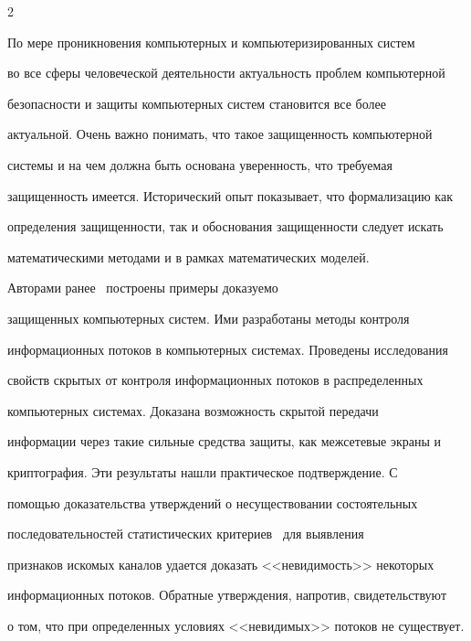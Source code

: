       \begin{multicols}{2}





      \label{st\stat}





    По мере проникновения компьютерных и компьютеризированных систем 


во все сферы человеческой деятельности актуальность проблем компьютерной 


безопасности и защиты компьютерных систем становится все более 


актуальной. Очень важно понимать, что такое защищенность компьютерной 


системы и на чем должна быть основана уверенность, что требуемая 


защищенность имеется. Исторический опыт показывает, что формализацию как 


определения защищенности, так и обоснования защищенности следует искать 


математическими методами и в рамках математических моделей.


    


    Авторами ранее~\cite{5gr, 6gr} построены примеры доказуемо 


защищенных компьютерных систем. Ими разработаны методы контроля 


информационных потоков в компьютерных системах. Проведены исследования 


свойств скрытых от контроля информационных потоков в распределенных 


компьютерных системах. Доказана возможность скрытой передачи 


информации через такие сильные средства защиты, как межсетевые экраны и 


криптография. Эти результаты нашли практическое подтверждение. С 


помощью доказательства утверждений о несуществовании состоятельных 


последовательностей статистических критериев~\cite{1gr, 2gr} для выяв\-ления 


признаков искомых каналов удается дока\-зать <<невидимость>> некоторых 


информационных по\-токов. Обратные утверждения, напротив, свидетельствуют 


о том, что при определенных условиях <<невидимых>> потоков не существует. 



\end{multicols}
